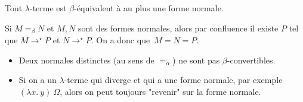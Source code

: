 \documentclass[./main]{subfiles}
\begin{document}
  \begin{prop}
    Tout $\lambda$-terme est $\beta$-équivalent à au plus une forme normale.
  \end{prop}
  \begin{prv}
    Si $M =_\beta N$ et  $M,N$ sont des formes normales, alors par confluence il existe $P$ tel que $M \to^\star P$ et $N \to^\star P$.
    On a donc que~$M = N = P$.
  \end{prv}

  \begin{rmk}[Conséquences]
    \begin{itemize}
      \item Deux normales distinctes (au sens de $=_\alpha$) ne sont pas $\beta$-convertibles.
      \item Si on a un $\lambda$-terme qui diverge et qui a une forme normale, par exemple $(\lambda x.\: y) \: \Omega$, alors on peut toujours "revenir" sur la forme normale.
    \end{itemize}
  \end{rmk}
\end{document}
